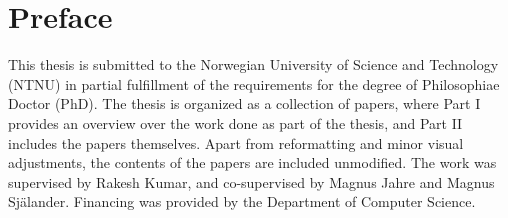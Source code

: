 \documentclass[../main.tex]{subfiles}
\begin{document}
\chapter{Preface}

This thesis is submitted to the Norwegian University of Science and Technology (NTNU) in partial fulfillment of the requirements for the degree of Philosophiae Doctor (PhD). The thesis is organized as a collection of papers, where Part I provides an overview over the work done as part of the thesis, and Part II includes the papers themselves. Apart from reformatting and minor visual adjustments, the contents of the papers are included unmodified. The work was supervised by Rakesh Kumar, and co-supervised by Magnus Jahre and Magnus Själander. Financing was provided by the Department of Computer Science.
\end{document}
